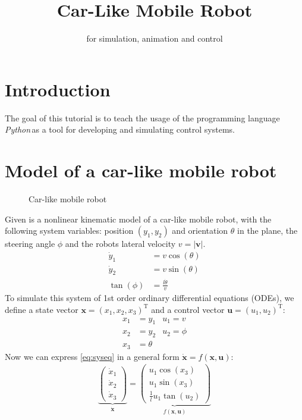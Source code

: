 \documentclass[a4paper,11pt,headings=standardclasses]{scrartcl}%
\title{Car-Like Mobile Robot}
\subtitle{\py for simulation, animation and control}%
\author{}
\date{}
\newcommand{\py}{\emph{Python}\,}
\newcommand{\uu}{\mathbf{u}}
\newcommand{\x}{\mathbf{x}}
\begin{document}
\maketitle%
\tableofcontents
\newpage
\section{Introduction}
The goal of this tutorial is to teach the usage of the programming language \py as a tool for developing and simulating control systems.

\section{Model of a car-like mobile robot}
\label{sec:model}
\begin{figure}[ht]
	\centering
	\def\svgwidth{0.7\textwidth}
	
	\caption{Car-like mobile robot}
	\label{fig:car}
\end{figure}
Given is a nonlinear kinematic model of a car-like mobile robot, with the following system variables: position $(y_1, y_2)$ and orientation $\theta$ in the plane, the steering angle $\phi$ and the robots lateral velocity $v=\left| \mathbf{v} \right| $. 
\begin{subequations}\label{eq:syseq}
\begin{align}
\dot{y}_1&=v \cos (\theta) \\
\dot{y}_2&=v \sin (\theta) \\
\tan(\phi) &= \frac{l\dot{\theta}}{v}
\end{align}
\end{subequations}
To simulate this system of 1st order ordinary differential equations (ODEs), we define a state vector $\x=(x_1,x_2,x_3)^\mathrm{T}$ and a control vector $\uu=(u_1,u_2)^\mathrm{T}$:
\begin{align*}
x_1 &= y_1 & u_1 = v\\
x_2 &= y_2 & u_2 = \phi \\
x_3 &= \theta 
\end{align*}
Now we can express \eqref{eq:syseq} in a general form $\dot{\x}=f(\x,\uu)$:
\label{eq:ss_system}
\begin{align}
\underbrace{\begin{pmatrix} \dot{x}_1 \\ \dot{x}_2 \\ \dot{x}_3 \end{pmatrix}}_{\dot{\x}} = \underbrace{\begin{pmatrix}  u_1 \cos(x_3) \\ u_1 \sin(x_3) \\ \frac{1}{l}u_1 \tan(u_2) \end{pmatrix}}_{f(\x,\uu)}
\end{align}
\end{document}
